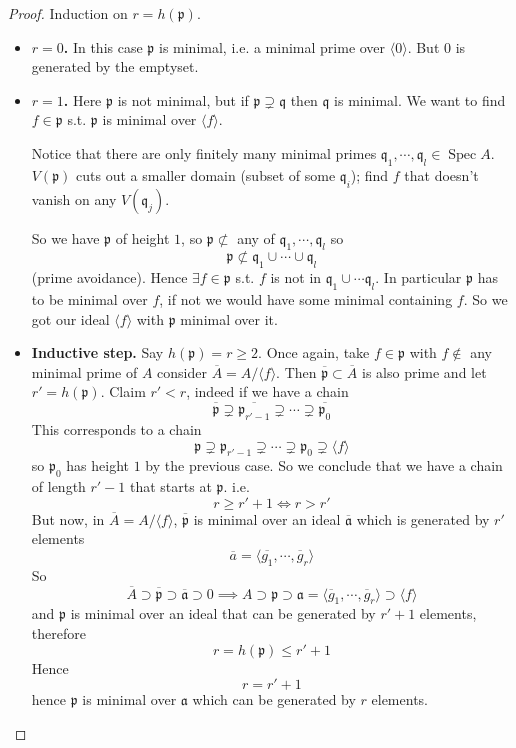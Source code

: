 \documentclass[11pt,a4paper]{article}
\theoremstyle{definition}
\theoremstyle{plain}
\theoremstyle{remark}
\newcommand{\angles}[1]{\langle #1 \rangle}
\newcommand{\Spec}{\operatorname{Spec}}
\begin{document}
\begin{proof}
    Induction on $r = h(\mathfrak{p})$. 
    \begin{itemize}
        \item \textbf{$r=0$.} In this case $\mathfrak{p}$ is minimal, i.e. a minimal prime over $\angles{0}$. But $0$ is generated by the emptyset.
        \item \textbf{$r=1$.} Here $\mathfrak{p}$ is not minimal, but if $\mathfrak{p} \supsetneq \mathfrak{q}$ then $\mathfrak{q}$ is minimal. 
        We want to find $f \in \mathfrak{p}$ s.t. $\mathfrak{p}$ is minimal over $\angles{f}$. 
        
        Notice that there are only finitely many minimal primes $\mathfrak{q}_1, \cdots, \mathfrak{q}_l \in \Spec A$. $V(\mathfrak{p})$ cuts out a smaller domain 
        (subset of some $\mathfrak{q}_i$); find $f$ that doesn't vanish on any $V(\mathfrak{q}_j)$. 

        So we have $\mathfrak{p}$ of height $1$, so $\mathfrak{p} \not\subset$ any of $\mathfrak{q}_1, \cdots, \mathfrak{q}_l$ so 
        $$\mathfrak{p} \not\subset \mathfrak{q}_1 \cup \cdots \cup \mathfrak{q}_l$$
        (prime avoidance). Hence $\exists f \in \mathfrak{p}$ s.t. $f$ is not in $\mathfrak{q}_1 \cup \cdots \mathfrak{q}_l$. In particular $\mathfrak{p}$ has to be minimal over $f$, 
        if not we would have some minimal containing $f$. So we got our ideal $\angles{f}$ with $\mathfrak{p}$ minimal over it. 
        
        \item \textbf{Inductive step.} Say $h(\mathfrak{p}) = r \ge 2$. Once again, take $f \in \mathfrak{p}$ with $f \not\in $ any minimal prime of $A$ consider 
        $\overline{A} = A / \angles{f}$. Then $\overline{\mathfrak{p}} \subset \overline{A}$ is also prime and let $r' = h(\mathfrak{p})$. Claim $r' < r$, indeed if we have a chain 
        $$\overline{\mathfrak{p}} \supsetneq \overline{\mathfrak{p}_{r'-1}} \supsetneq \cdots \supsetneq \overline{\mathfrak{p}_0}$$
        This corresponds to a chain 
        $$\mathfrak{p} \supsetneq \mathfrak{p}_{r'-1} \supsetneq \cdots \supsetneq \mathfrak{p}_0 \supsetneq \angles{f}$$
        so $\mathfrak{p}_0$ has height $1$ by the previous case. So we conclude that we have a chain of length $r'-1 $ that starts at $\mathfrak{p}$. 
        i.e.
        $$r \ge r'+1 \iff r > r'$$
        But now, in $\overline{A} = A / \angles{f}$, $\mathfrak{\overline{p}}$ is minimal over an ideal $\overline{\mathfrak{a}}$ which is generated by $r'$ elements 
        $$\overline{a} = \angles{\overline{g_1}, \cdots, \overline{g}_r}$$
        So 
        $$\overline{A} \supset \overline{\mathfrak{p}} \supset \overline{\mathfrak{a}} \supset 0 \implies A \supset \mathfrak{p} \supset \mathfrak{a} = \angles{\overline{g}_1, \cdots, \overline{g}_r} \supset \angles{f}$$
        and $\mathfrak{p}$ is minimal over an ideal that can be generated by $r'+1$ elements, therefore 
        $$r = h(\mathfrak{p}) \le r'+1$$
        Hence 
        $$r = r'+1$$
        hence $\mathfrak{p}$ is minimal over $\mathfrak{a}$ which can be generated by $r$ elements. 
    \end{itemize}
\end{proof}
\end{document}
